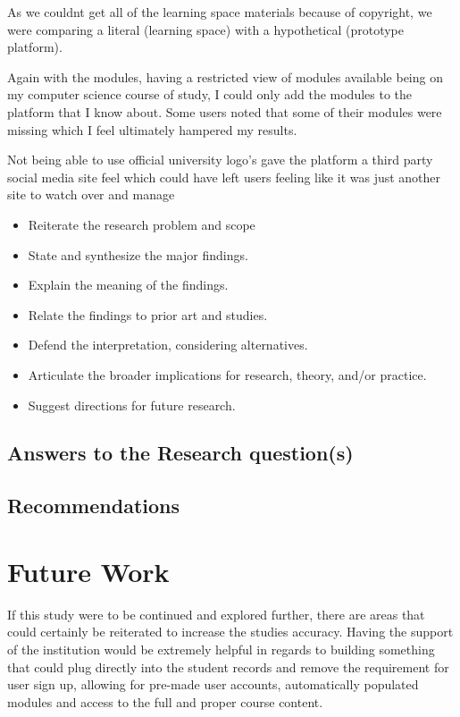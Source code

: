 \documentclass[lettersize,journal]{IEEEtran}
\begin{document}
As we couldnt get all of the learning space materials because of copyright, we were comparing a literal (learning space) with a hypothetical (prototype platform).


Again with the modules, having a restricted view of modules available being on my computer science course of study, I could only add the modules to the platform
that I know about. Some users noted that some of their modules were missing which I feel ultimately hampered my results.

Not being able to use official university logo's gave the platform a third party social media site feel which could have left users feeling like it was just another site to 
watch over and manage


\begin{itemize}
	\item Reiterate the research problem and scope
	\item State and synthesize the major findings.
	\item Explain the meaning of the findings.
	\item Relate the findings to prior art and studies.
	\item Defend the interpretation, considering alternatives.
	\item Articulate the broader implications for research, theory, and/or practice.
	\item Suggest directions for future research.

		\end{itemize}





\subsection{Answers to the Research question(s)}
\subsection{Recommendations}
\section{Future Work}
	If this study were to be continued and explored further, there are areas that could certainly be reiterated to increase the studies accuracy. Having the support of the institution would be extremely helpful in regards to building something that could plug directly into the student records and remove the requirement for user sign up, allowing for pre-made user accounts, automatically populated modules and access to the full and proper course content.
\end{document}
